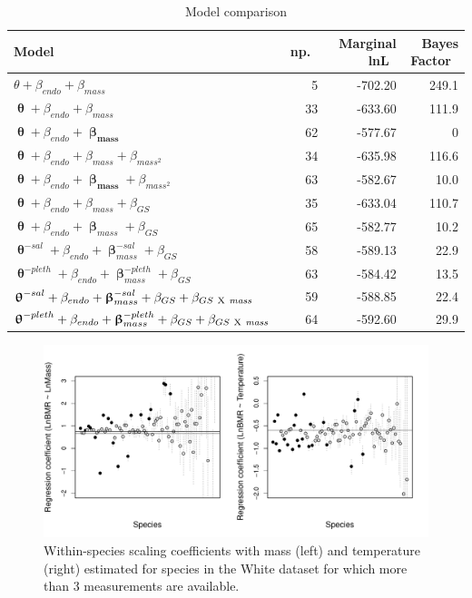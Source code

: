 \documentclass[a4paper,11pt]{article}
\begin{document}
\begin{table}[p]
\begin{tabular}{l | r | r | r |}
Model &\ np.\ &\ Marginal lnL\ &\ Bayes Factor\ \\
\hline
$\theta + \beta_{endo} + \beta_{mass}$ & 5 & -702.20 & 249.1 \\
$\boldsymbol{\uptheta} + \beta_{endo}+\beta_{mass}$ & 33 & -633.60 & 111.9 \\
$\boldsymbol{\uptheta} + \beta_{endo}+\boldsymbol{\upbeta_{mass}}$ & 62 & -577.67 & 0 \\
$\boldsymbol{\uptheta} + \beta_{endo}+\beta_{mass} + \beta_{mass^2}$ & 34 & -635.98 &  116.6\\
$\boldsymbol{\uptheta} + \beta_{endo}+\boldsymbol{\upbeta_{mass}} + \beta_{mass^2}$ & 63 & -582.67 & 10.0 \\
$\boldsymbol{\uptheta} + \beta_{endo}+\beta_{mass} + \beta_{GS}$ & 35 & -633.04 & 110.7 \\
$\boldsymbol{\uptheta} + \beta_{endo}+\boldsymbol\upbeta_{mass} + \beta_{GS}$ & 65 & -582.77 & 10.2 \\
$\boldsymbol{\uptheta}^{-sal} + \beta_{endo}+\boldsymbol\upbeta_{mass}^{-sal} + \beta_{GS}$ & 58 & -589.13 & 22.9 \\
$\boldsymbol{\uptheta}^{-pleth} + \beta_{endo}+\boldsymbol\upbeta_{mass}^{-pleth} + \beta_{GS}$ & 63 &-584.42 & 13.5 \\
$\boldsymbol{\uptheta}^{-sal} + \beta_{endo}+\boldsymbol\upbeta_{mass}^{-sal} + \beta_{GS} + \beta_{GS \ \rm{X} \ \it{mass}}$ & 59 &-588.85  & 22.4 \\
$\boldsymbol{\uptheta}^{-pleth} + \beta_{endo}+\boldsymbol\upbeta_{mass}^{-pleth} + \beta_{GS} + \beta_{GS \ \rm{X} \ \it{mass}}$ & 64 & -592.60  & 29.9 \\

\end{tabular}
\caption{Model comparison}
\label{bf}
\end{table}

\renewcommand\thefigure{S.\arabic{figure}}
\renewcommand\thetable{S.\arabic{table}}


\begin{figure}
\centering
\includegraphics[scale=0.4]{figs/WithinSpeciesCoefficients.pdf}
\caption{Within-species scaling coefficients with mass (left) and temperature (right) estimated for species in the White dataset for which more than 3 measurements are available. }
\label{withincoef}
\end{figure}


%
\end{document}
